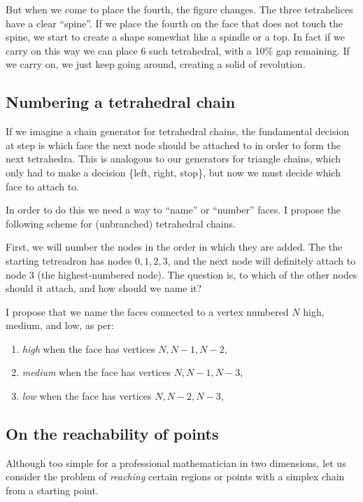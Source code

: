 \documentclass[11pt]{article}
\begin{document}
But when we come to place the fourth, the figure changes. The three tetrahelices have a clear ``spine''. If we
place the fourth on the face that does not touch the spine, we start to create a shape somewhat like a spindle or a top.
In fact if we carry on this way we can place 6 such tetrahedral, with a 10\% gap remaining. If we carry on, we just keep
going around, creating a solid of revolution.

\subsection{Numbering a tetrahedral chain}

If we imagine a chain generator for tetrahedral chains, the fundamental decision at step is which face the next node should be attached to in order
to form the next tetrahedra. This is analogous to our generators for triangle chains, which only had to make a decision \{left, right, stop\}, but
now we must decide which face to attach to.

In order to do this we need a way to ``name'' or ``number'' faces. I propose the following scheme for (unbranched) tetrahedral chains.

First, we will number the nodes in the order in which they are added. The the starting tetreadron has nodes ${0,1,2,3}$, and the next
node will definitely attach to node $3$ (the highest-numbered node). The question is, to which of the other nodes should it attach,
and how should we name it?

I propose that we name the faces connected to a vertex numbered $N$ high, medium, and low, as per:
\begin{enumerate}
\item {\em high} when the face has vertices ${N, N-1, N-2}$,
\item {\em medium} when the face has vertices ${N, N-1, N-3}$,
  \item {\em low} when the face has vertices ${N, N-2, N-3}$,    
\end{enumerate}

\subsection{On the reachability of points}

Although too simple for a professional mathematician in two dimensions, let us consider the problem of {\em reaching} certain regions
or points with a simplex chain from a starting point.
\end{document}
